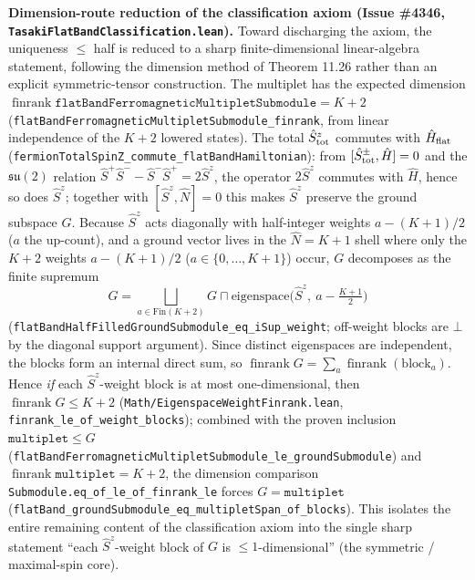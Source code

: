 \documentclass[a4paper,11pt]{article}
\begin{document}
\medskip
\noindent\textbf{Dimension-route reduction of the classification axiom (Issue
\#4346, \texttt{TasakiFlatBandClassification.lean}).}  Toward discharging the axiom,
the uniqueness $\leq$ half is reduced to a sharp finite-dimensional linear-algebra
statement, following the dimension method of Theorem 11.26 rather than an explicit
symmetric-tensor construction. The multiplet has the expected dimension
$\operatorname{finrank}\texttt{flatBandFerromagneticMultipletSubmodule}=K+2$
(\texttt{flatBandFerromagneticMultipletSubmodule\_finrank}, from linear independence
of the $K+2$ lowered states). The total $\hat S^z_{\rm tot}$ commutes with $\hat
H_{\rm flat}$ (\texttt{fermionTotalSpinZ\_commute\_flatBandHamiltonian}): from
$[\hat S^\pm_{\rm tot},\hat H]=0$ and the $\mathfrak{su}(2)$ relation $\hat
S^+\hat S^- - \hat S^-\hat S^+ = 2\hat S^z$, the operator $2\hat S^z$ commutes with
$\hat H$, hence so does $\hat S^z$; together with $[\hat S^z,\hat N]=0$ this makes
$\hat S^z$ preserve the ground subspace $G$. Because $\hat S^z$ acts diagonally with
half-integer weights $a-(K+1)/2$ ($a$ the up-count), and a ground vector lives in
the $\hat N=K+1$ shell where only the $K+2$ weights $a-(K+1)/2$ ($a\in\{0,\dots,K+1\}$)
occur, $G$ decomposes as the finite supremum
\[
  G = \bigsqcup_{a\in\mathrm{Fin}(K+2)}
        G \sqcap \mathrm{eigenspace}\bigl(\hat S^z,\ a-\tfrac{K+1}{2}\bigr)
\]
(\texttt{flatBandHalfFilledGroundSubmodule\_eq\_iSup\_weight}; off-weight blocks are
$\bot$ by the diagonal support argument). Since distinct eigenspaces are independent,
the blocks form an internal direct sum, so $\operatorname{finrank}G=\sum_a
\operatorname{finrank}(\text{block}_a)$. Hence \emph{if} each $\hat S^z$-weight block
is at most one-dimensional, then $\operatorname{finrank}G\leq K+2$
(\texttt{Math/EigenspaceWeightFinrank.lean},
\texttt{finrank\_le\_of\_weight\_blocks}); combined with the proven inclusion
$\texttt{multiplet}\leq G$
(\texttt{flatBandFerromagneticMultipletSubmodule\_le\_groundSubmodule}) and
$\operatorname{finrank}\texttt{multiplet}=K+2$, the dimension comparison
\texttt{Submodule.eq\_of\_le\_of\_finrank\_le} forces $G=\texttt{multiplet}$
(\texttt{flatBand\_groundSubmodule\_eq\_multipletSpan\_of\_blocks}). This isolates the
entire remaining content of the classification axiom into the single sharp statement
``each $\hat S^z$-weight block of $G$ is $\leq 1$-dimensional'' (the symmetric /
maximal-spin core).
\end{document}

